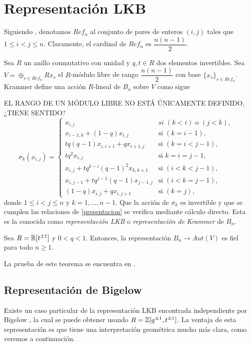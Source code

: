 \documentclass[TFG.tex]{subfiles}
\begin{document}
\section{Representación LKB}
Siguiendo \cite{Krammer}, denotamos $Ref_n$ al conjunto de pares de enteros $(i,j)$ tales que $1\leq i<j\leq n$. Claramente, el cardinal de $Ref_n$ es $\dfrac{n(n-1)}{2}$.

Sea $R$ un anillo conmutativo con unidad y $q,t\in R$ dos elementos invertibles. Sea $V=\oplus_{s\in Ref_n}Rx_s$ el $R$-módulo libre de rango $\dfrac{n(n-1)}{2}$ con base $\{x_s\}_{s\in Ref_n}$. Krammer define una acción $R$-lineal de $B_n$ sobre $V$ como sigue


EL RANGO DE UN MÓDULO LIBRE NO ESTÁ ÚNICAMENTE DEFINIDO, ¿TIENE SENTIDO?
\begin{equation}\label{LKB}
\sigma_k(x_{i,j})=\begin{cases}
x_{i,j} & \textit{si }(k<i)\text{ o }(j<k),\\
x_{i-1,k}+(1-q)x_{i,j} & \text{si } (k=i-1),\\
tq(q-1)x_{i,i+1}+qx_{i+1,j} & \text{si }(k=i<j-1),\\
tq^2x_{i,j} & \text{si }k=i=j-1,\\
x_{i,j}+tq^{k-i}(q-1)^2x_{k,k+1} & \text{si }(i<k<j-1),\\
x_{i,j-1}+tq^{j-1}(q-1)x_{j-1,j} & \text{si }(i<k=j-1),\\
(1-q)x_{i,j}+qx_{i,j+1} & \text{si }(k=j),
\end{cases}
\end{equation}
donde $1\leq i<j\leq n$ y $k=1,\dots, n-1$. Que la acción de $\sigma_k$ es invertible y que se cumplen las relaciones de \ref{presentacion} se verifica mediante cálculo directo. Esta es la conocida como \emph{representación LKB} o \emph{representación de Krammer} de $B_n$.


\begin{teorema}
Sea $R=\mathbb{R}[t^{\pm 1}]$ y $0<q<1$. Entonces, la representación $B_n\to Aut(V)$ es fiel para todo $n\geq 1$.
\end{teorema}

La prueba de este teorema se encuentra en \cite{Krammer}.


\subsection{Representación de Bigelow}
Existe un caso particular de la representación LKB encontrada independiente por Bigelow \cite{Bil}, la cual se puede obtener usando $R=\mathbb{Z}[q^{\pm 1},t^{\pm 1}]$. La ventaja de esta representación es que tiene una interpretación geométrica mucho más clara, como veremos a continuación.
\end{document}
